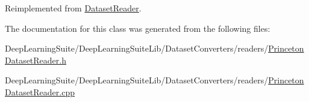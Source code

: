 Reimplemented from \hyperlink{class_dataset_reader_a732438244cec7c20294f93c6b635888c}{Dataset\+Reader}.



The documentation for this class was generated from the following files\+:\begin{DoxyCompactItemize}
\item 
Deep\+Learning\+Suite/\+Deep\+Learning\+Suite\+Lib/\+Dataset\+Converters/readers/\hyperlink{_princeton_dataset_reader_8h}{Princeton\+Dataset\+Reader.\+h}\item 
Deep\+Learning\+Suite/\+Deep\+Learning\+Suite\+Lib/\+Dataset\+Converters/readers/\hyperlink{_princeton_dataset_reader_8cpp}{Princeton\+Dataset\+Reader.\+cpp}\end{DoxyCompactItemize}
